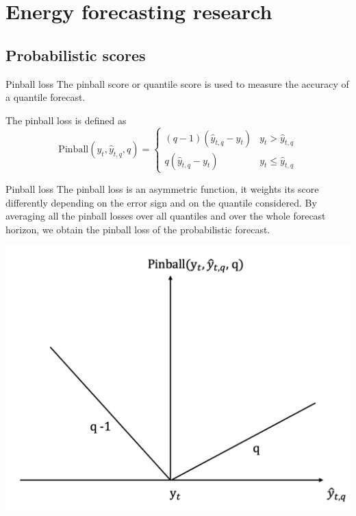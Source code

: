 
\section{Energy forecasting research}


\subsection{Probabilistic scores}
\begin{frame}{Pinball loss}
    The pinball score or quantile score is used to measure the accuracy of a quantile forecast.
\begin{definition}
    The pinball loss is defined as
    $$
    \mathrm{Pinball}(y_{t},\hat{y}_{t,q},q)=
\begin{cases}
(q-1)(\hat{y}_{t,q}-y_{t}) & y_t > \hat{y}_{t,q} \\
q(\hat{y}_{t,q}-y_t) & y_t \leq \hat{y}_{t,q}
\end{cases}
$$
\end{definition}
\end{frame}


\begin{frame}{Pinball loss}
    The pinball loss is an asymmetric function, it weights its score differently depending on the error sign and on the quantile considered.
By averaging all the pinball losses over all quantiles and over the whole forecast horizon, we obtain the pinball loss of the probabilistic forecast.
    \begin{center}
        \includegraphics[height=0.5\textheight]{../thesis/images/pinball_loss.png}
    \end{center}
\end{frame}





